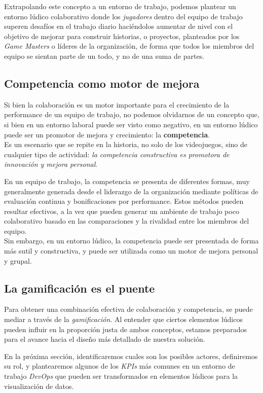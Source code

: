 \documentclass[journal]{IEEEtran}
\begin{document}
Extrapolando este concepto a un entorno de trabajo, podemos plantear un entorno lúdico colaborativo donde los \textit{jugadores} dentro del equipo de trabajo superen desafíos en el trabajo diario haciéndolos aumentar de nivel con el objetivo de mejorar para construir historias, o proyectos, planteados por los \textit{Game Masters} o líderes de la organización, de forma que todos los miembros del equipo se sientan parte de un todo, y no de una suma de partes.

\subsection{\textbf{Competencia como motor de mejora}}
Si bien la colaboración es un motor importante para el crecimiento de la performance de un equipo de trabajo, no podemos olvidarnos de un concepto que, si bien en un entorno laboral puede ser visto como negativo, en un entorno lúdico puede ser un promotor de mejora y crecimiento: la \textbf{competencia}.
\\Es un escenario que se repite en la historia, no solo de los videojuegos, sino de cualquier tipo de actividad: \textit{la competencia constructiva es promotora de innovación y mejora personal}.

En un equipo de trabajo, la competencia se presenta de diferentes formas, muy generalmente generada desde el liderazgo de la organización mediante políticas de evaluación continua y bonificaciones por performance. Estos métodos pueden resultar efectivos, a la vez que pueden generar un ambiente de trabajo poco colaborativo basado en las comparaciones y la rivalidad entre los miembros del equipo.
\\Sin embargo, en un entorno lúdico, la competencia puede ser presentada de forma más sutil y constructiva, y puede ser utilizada como un motor de mejora personal y grupal.

\subsection{\textbf{La gamificación es el puente}}
Para obtener una combinación efectiva de colaboración y competencia, se puede mediar a través de la \textit{gamificación}. Al entender que ciertos elementos lúdicos pueden influir en la proporción justa de ambos conceptos, estamos preparados para el avance hacia el diseño más detallado de nuestra solución.

En la próxima sección, identificaremos cuales son los posibles actores, definiremos su rol, y plantearemos algunos de los \textit{KPIs} más comunes en un entorno de trabajo \textit{DevOps} que pueden ser transformados en elementos lúdicos para la visualización de datos.
\end{document}
